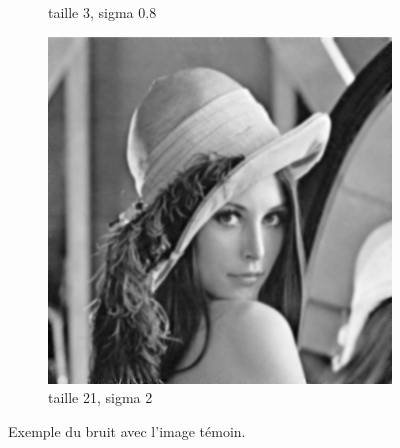 \documentclass[hidelinks,11pt]{article}
\theoremstyle{mytheoremstyle}
\theoremstyle{mytheoremstyle}
\theoremstyle{myproblemstyle}
\begin{document}
\begin{figure}
\begin{subfigure}[b]{0.3\textwidth}
            \caption{taille 3, sigma 0.8}
        \end{subfigure}
        \hfill
        \begin{subfigure}[b]{0.3\textwidth}
            \centering
            \includegraphics[width=\textwidth]{figs/fig6c}
            \caption{taille 21, sigma 2}
        \end{subfigure}
           \caption{Exemple du bruit avec l'image témoin.}
   \end{figure}
\end{document}

